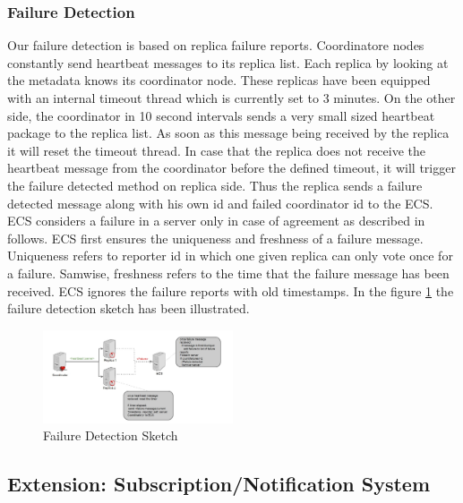 \documentclass{sig-alternate}
\begin{document}
\subsubsection{Failure Detection}
Our failure detection is based on replica failure reports. Coordinatore nodes 
constantly send heartbeat messages to its replica list. Each replica by looking at the metadata knows its coordinator node. These replicas have been equipped with an internal timeout thread which is currently set to 3 minutes. On the other side, the coordinator in 10 second intervals sends a very small sized heartbeat package to the replica list. As soon as this message being received by the replica  it will reset the timeout thread. In case that the replica does not receive the heartbeat message from the coordinator before the defined timeout, it will trigger the failure   detected method on replica side. Thus the replica sends a failure detected message along with his own id and failed coordinator id to the ECS. 
ECS considers a failure in a server only in case of agreement as described in follows. ECS first ensures the uniqueness and freshness of a failure message. Uniqueness refers to reporter id in which one given replica can only vote once for a failure. Samwise, freshness refers to the time that the failure message has been received. ECS ignores the failure reports with old timestamps.
In the figure \ref{failuredetection} the failure detection sketch has been illustrated.


\begin{center}
\begin{figure}[ht!]
\centering
     \includegraphics[width=0.5\textwidth]{FailureDetection.jpg}
\caption{Failure Detection Sketch \label{failuredetection}}
\end{figure}
\end{center}

\subsection{Extension: Subscription/Notification System }
\end{document}
